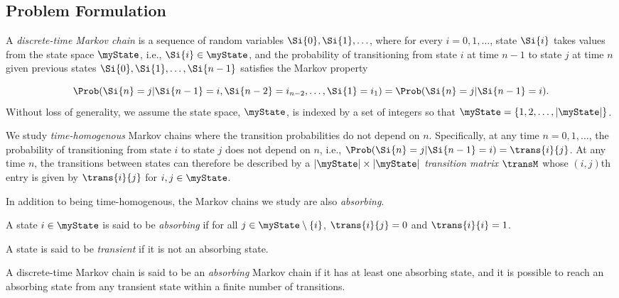 \subsection{Problem Formulation}

A \emph{discrete-time Markov chain} is a sequence of random variables $\Si{0}, \Si{1}, \ldots $, where for every $i = 0, 1, \ldots$, state $\Si{i}$ takes values from the state space $\myState$, i.e., $\Si{i} \in \myState$, and the probability of transitioning from state $i$ at time $n-1$ to state $j$ at time $n$ given previous states $\Si{0}, \Si{1}, \ldots, \Si{n-1}$ satisfies the Markov property 

\begin{equation}
	\Prob(\Si{n} = j | \Si{n-1} = i, \Si{n- 2} = i_{n-2}, \ldots, \Si{1} = i_{1}) = \Prob(\Si{n} = j | \Si{n-1} = i).
\end{equation}
%
Without loss of generality, we assume the state space, $\myState$, is indexed by a set of integers so that $\myState = \{1, 2, \ldots, |\myState|\}$.

We study \emph{time-homogenous} Markov chains where the transition probabilities do not depend on $n$.  Specifically, at any time $n = 0, 1, \ldots$, the probability of transitioning from state $i$ to state $j$ does not depend on $n$, i.e., $\Prob(\Si{n} = j | \Si{n-1} = i) = \trans{i}{j}$.  At any time $n$, the transitions between states can therefore be described by a $|\myState| \times |\myState|$ \emph{transition matrix} $\transM$ whose $(i, j)$th entry is given by $\trans{i}{j}$ for $i, j \in \myState$.

In addition to being time-homogenous, the Markov chains we study are also \emph{absorbing}.

\begin{mydef}
	A state $i \in \myState$ is said to be \emph{absorbing} if for all $j \in \myState \setminus \{i\}$, $\trans{i}{j} = 0$  and $\trans{i}{i} = 1$.
\end{mydef}

\begin{mydef}
	A state is said to be \emph{transient} if it is not an absorbing state.
\end{mydef}

\begin{mydef}
	A discrete-time Markov chain is said to be an \emph{absorbing} Markov chain if it has at least one absorbing state, and it is possible to reach an absorbing state from any transient state within a finite number of transitions.
\end{mydef}

